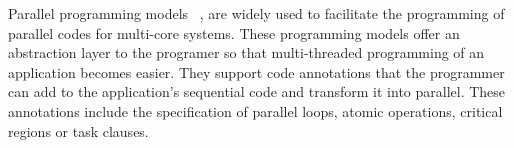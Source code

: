 
Parallel programming models ~\cite{Blumofe:PPoPP1995, Reinders2007, Bauer2012, OmpSs},  are widely used to facilitate the programming of parallel codes for multi-core systems.
These programming models offer an abstraction layer to the programer so that multi-threaded programming of an application becomes easier.
They support code annotations that the programmer can add to the application's sequential code and transform it into parallel.
These annotations include the specification of parallel loops, atomic operations, critical regions or task clauses.

